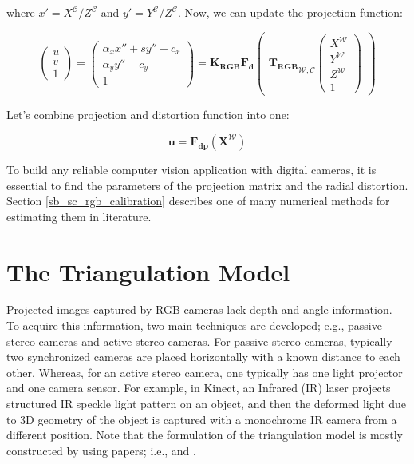 \documentclass[12pt]{report}
\numberwithin{figure}{section}
\begin{document}
where $x' = X^{\mathcal{C}}/Z^{\mathcal{C}}$ and $y' = 
Y^{\mathcal{C}}/Z^{\mathcal{C}}$. Now, we 
can update 
the 
projection function:

\begin{equation}
  \begin{pmatrix}
    u\\
    v\\
    1
  \end{pmatrix}
  =
  \begin{pmatrix}
    \alpha_x x'' + sy''+ c_x\\
    \alpha_y y'' + c_y\\
    1
  \end{pmatrix}
    =
    \mathbf{K_{RGB}}
    \mathbf{F_{d}}\begin{pmatrix}
       {\mathbf{T_{RGB}}}_{\mathcal{W}, \mathcal{C}}
      \begin{pmatrix}
        X^{\mathcal{W}}\\
        Y^{\mathcal{W}}\\
        Z^{\mathcal{W}}\\
        1
      \end{pmatrix}
    \end{pmatrix}\label{eq:proj_func_w_f_c}
\end{equation} 

Let's combine projection and distortion function into one:

\begin{equation}\label{eq:simplyfied_dist_proj_func}
  \mathbf{u} = \mathbf{F_{dp}}(\mathbf{X^{\mathcal{W}}})
\end{equation} 


To build any reliable computer vision application with digital cameras, it is 
essential to find the parameters of the projection matrix and the radial 
distortion.  Section \ref{sb_sc_rgb_calibration} describes one of many 
numerical methods for 
estimating them in literature.

\section{The Triangulation Model} \label{sc_depth_model}

Projected images captured by RGB cameras lack depth and angle information. To 
acquire this information, two main techniques are developed; e.g., passive 
stereo cameras and active stereo cameras. For passive stereo cameras, 
typically two synchronized cameras are placed horizontally with a known 
distance to each other. 
Whereas, for an active stereo camera, one typically has one light projector 
and one camera sensor. For example, in Kinect, an Infrared (IR) laser projects 
structured IR speckle light pattern on an object, and then the deformed light 
due to 3D geometry of the object is captured with a monochrome IR camera from 
a different position. Note that the formulation of the triangulation model is 
mostly constructed by using papers; i.e., \parencite{Park2012a} and 
\parencite{Khoshelham2012a}.
\end{document}
